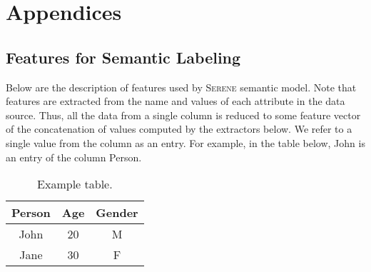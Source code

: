 \documentclass[letterpaper]{article} %
\newcommand{\serene}{\textsc{Serene}}
\begin{document}
\newpage
\section*{Appendices}
\renewcommand{\thesubsection}{\Alph{subsection}}

\subsection{Features for Semantic Labeling\label{Ann:SemLab}}

Below are the description of features used by \serene{} semantic model.
Note that features are extracted from the name and values of each attribute in the data source.
Thus, all the data from a single column is reduced to some feature
vector of the concatenation of values computed by the extractors below.
We refer to a single value from the column as an entry. For example, in the table below, John is an entry of the column Person.

\begin{table}[!ht]\small
  \centering
  \caption{Example table.}
  	\begin{tabular}{ccc} 
  		\hline
		Person & Age & Gender \\
  		\hline
	    John & 20 & M\\
    	Jane & 30 & F\\
  		\hline
		\end{tabular} 
\vspace*{-3mm}
\end{table}
\end{document}
